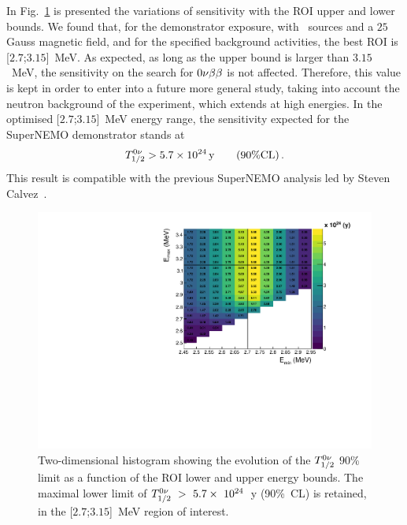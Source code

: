 In Fig.~\ref{fig:sensitivity_cont} is presented the variations of sensitivity with the ROI upper and lower bounds.
We found that, for the demonstrator exposure, with \Se\ sources and a $25$ Gauss magnetic field, and for the specified background activities, the best ROI is [$2.7$;$3.15$]~MeV.
As expected, as long as the upper bound is larger than $3.15$~MeV, the sensitivity on the search for $0\nu\beta\beta$ is not affected.
Therefore, this value is kept in order to enter into a future more general study, taking into account the neutron background of the experiment, which extends at high energies.
In the optimised [$2.7$;$3.15$]~MeV energy range, the sensitivity expected for the SuperNEMO demonstrator stands at
\begin{equation}
T_{1/2}^{0\nu} > 5.7\times 10^{24}\,\text{y}\qquad (90\% \text{CL})\,.
\end{equation}
This result is compatible with the previous SuperNEMO analysis led by Steven Calvez~\cite{CalvezThesis}.
\begin{figure}[h!]
  \centering
  \includegraphics[width=1.1\textwidth]{Sensitivity/fig_sensitivity/sensitivity_spectrum_with_B_82Se.pdf}
  \caption{Two-dimensional histogram showing the evolution of the $T_{1/2}^{0\nu}$ $90$\% limit as a function of the ROI lower and upper energy bounds.
    The maximal lower limit of $T_{1/2}^{0\nu}~>~5.7\times~10^{24}$~y (90\%~CL) is retained, in the [$2.7$;$3.15$]~MeV region of interest.
    \label{fig:sensitivity_cont}}
\end{figure}

